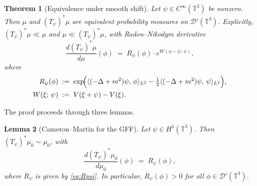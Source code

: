 \documentclass[12pt]{article}
\newtheorem{theorem}{Theorem}
\newtheorem{lemma}[theorem]{Lemma}
\theoremstyle{definition}
\begin{document}
\begin{theorem}[Equivalence under smooth shift]
\label{thm:main}
Let $\psi\in C^\infty(\mathbb{T}^3)$ be nonzero.  Then $\mu$ and $(T_\psi)^*\mu$ are equivalent
probability measures on $\mathcal{D}'(\mathbb{T}^3)$.  Explicitly, $(T_\psi)^*\mu \ll \mu$ and
$\mu \ll (T_\psi)^*\mu$, with Radon--Nikodym derivative
\begin{equation}
  \frac{d(T_\psi)^*\mu}{d\mu}(\phi)
  \;=\; R_\psi(\phi)\cdot e^{W(\phi-\psi;\,\psi)},
  \label{eq:RNderiv}
\end{equation}
where
\begin{align}
  R_\psi(\phi)
  &\;:=\; \exp\!\Bigl(\langle (-\Delta+m^2)\psi,\,\phi\rangle_{L^2}
        - \tfrac{1}{2}\langle (-\Delta+m^2)\psi,\,\psi\rangle_{L^2}\Bigr),
  \label{eq:Rpsi} \\
  W(\xi;\,\psi)
  &\;:=\; V(\xi+\psi) - V(\xi).
  \label{eq:Wpsi}
\end{align}
\end{theorem}

The proof proceeds through three lemmas.

\begin{lemma}[Cameron--Martin for the GFF]
\label{lem:CM}
Let $\psi\in H^1(\mathbb{T}^3)$.  Then $(T_\psi)^*\mu_0 \sim \mu_0$, with
\begin{equation}
  \frac{d(T_\psi)^*\mu_0}{d\mu_0}(\phi)
  \;=\; R_\psi(\phi),
  \label{eq:CMLGFF}
\end{equation}
where $R_\psi$ is given by \eqref{eq:Rpsi}.  In particular, $R_\psi(\phi) > 0$ for all
$\phi\in\mathcal{D}'(\mathbb{T}^3)$.
\end{lemma}
\end{document}
